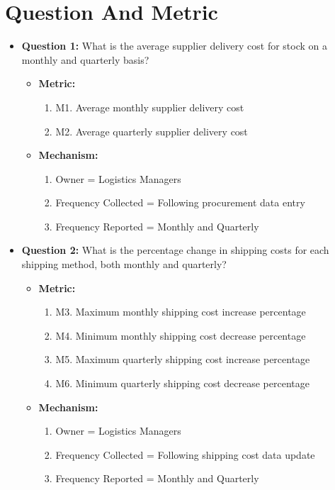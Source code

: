 \section{Question And Metric}
\begin{itemize}[align=left, left=0em,labelsep=0em]
	\item[\textbullet\ ] \textbf{Question 1:} What is the average supplier delivery cost for stock on a monthly and quarterly basis?
	\begin{itemize}[align=left, left=0em,labelsep=0em]
		\item[] \textbf{Metric:}
		\begin{enumerate}[label={}, left=0em, labelwidth=1em, labelsep=0em, align=left]
			\item M1. Average monthly supplier delivery cost
			\item M2. Average quarterly supplier delivery cost
		\end{enumerate}
		\item[] \textbf{Mechanism:}
		\begin{enumerate}[label={}, left=0em, labelwidth=1em, labelsep=0em, align=left]
			\item[i.] Owner = Logistics Managers
			\item[ii.] Frequency Collected = Following procurement data entry
			\item[iii.] Frequency Reported = Monthly and Quarterly
		\end{enumerate}
	\end{itemize}
	
	\item[\textbullet\ ] \textbf{Question 2:} What is the percentage change in shipping costs for each shipping method, both monthly and quarterly? 
	\begin{itemize}[align=left, left=0em,labelsep=0em]
		\item[] \textbf{Metric:}
		\begin{enumerate}[label={}, left=0em, labelwidth=1em, labelsep=0em, align=left]
			\item M3. Maximum monthly shipping cost increase percentage
			\item M4. Minimum monthly shipping cost decrease percentage
			\item M5. Maximum quarterly shipping cost increase percentage
			\item M6. Minimum quarterly shipping cost decrease percentage
		\end{enumerate}
		\item[] \textbf{Mechanism:}
		\begin{enumerate}[label={}, left=0em, labelwidth=1em, labelsep=0em, align=left]
			\item[i.] Owner = Logistics Managers
			\item[ii.] Frequency Collected = Following shipping cost data update
			\item[iii.] Frequency Reported = Monthly and Quarterly
		\end{enumerate}
	\end{itemize}
	

\end{itemize}
